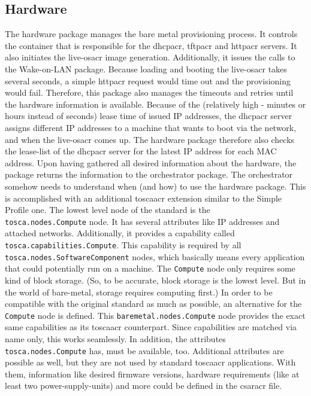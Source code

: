 \subsection{Hardware}
The hardware package manages the bare metal provisioning process. It controls the container that is responsible for the \gls{dhcpacr}, \gls{tftpacr} and \gls{httpacr} servers. It also initiates the live-\gls{osacr} image generation. Additionally, it issues the calls to the Wake-on-LAN package. Because loading and booting the live-\gls{osacr} takes several seconds, a simple \gls{httpacr} request would time out and the provisioning would fail. Therefore, this package also manages the timeouts and retries until the hardware information is available. Because of the (relatively high - minutes or hours instead of seconds) lease time of issued IP addresses, the \gls{dhcpacr} server assigns different IP addresses to a machine that wants to boot via the network, and when the live-\gls{osacr} comes up. The hardware package therefore also checks the lease-list of the \gls{dhcpacr} server for the latest IP address for each MAC address.
\newline
Upon having gathered all desired information about the hardware, the package returns the information to the orchestrator package.
\newline
The orchestrator somehow needs to understand when (and how) to use the hardware package. This is accomplished with an additional \gls{toscaacr} extension similar to the Simple Profile one. The lowest level node of the standard is the \\
\texttt{tosca.nodes.Compute} node. It has several attributes like IP addresses and attached networks. Additionally, it provides a capability called \texttt{tosca.capabilities.Compute}. This capability is required by all \texttt{tosca.nodes.SoftwareComponent} nodes, which basically means every application that could potentially run on a machine. The \texttt{Compute} node only requires some kind of block storage. (So, to be accurate, block storage is the lowest level. But in the world of bare-metal, storage requires computing first.)
\newline
In order to be compatible with the original standard as much as possible, an alternative for the \texttt{Compute} node is defined. This \texttt{baremetal.nodes.Compute} node provides the exact same capabilities as its \gls{toscaacr} counterpart. Since capabilities are matched via name only, this works seamlessly. In addition, the attributes \\ \texttt{tosca.nodes.Compute} has, must be available, too. Additional attributes are possible as well, but they are not used by standard \gls{toscaacr} applications. With them, information like desired firmware versions, hardware requirements (like at least two power-supply-units) and more could be defined in the \gls{csaracr} file. 
